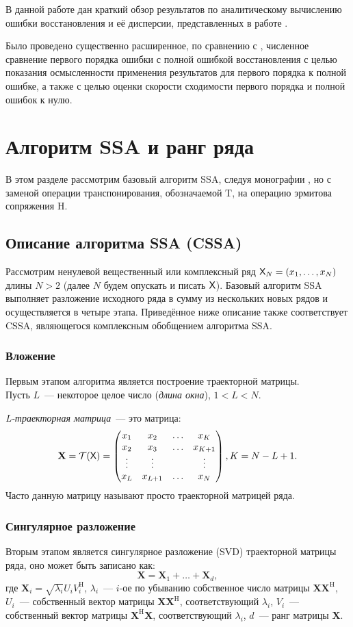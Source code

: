 \documentclass[specialist,
               substylefile = spbu.rtx,
               subf,href,colorlinks=true, 12pt]{disser}
\begin{document}
В данной работе дан краткий обзор результатов по аналитическому вычислению ошибки восстановления и её дисперсии, представленных в работе \cite{SenBach}.

Было проведено существенно расширенное, по сравнению с \cite{SenBach}, численное сравнение первого порядка ошибки с полной ошибкой восстановления с целью показания осмысленности применения результатов для первого порядка к полной ошибке, а также с целью оценки скорости сходимости первого порядка и полной ошибок к нулю.

\section{Алгоритм SSA и ранг ряда}
В этом разделе рассмотрим базовый алгоритм SSA, следуя монографии \cite{Golyandina.etal2001}, но с заменой операции транспонирования, обозначаемой $\mathrm{T}$, на операцию эрмитова сопряжения $\mathrm{H}$.
\subsection{Описание алгоритма SSA (CSSA)}
Рассмотрим ненулевой вещественный или комплексный ряд $\textsf{X}_N = (x_1, \ldots, x_{N})$ длины $N > 2$ (далее $N$ будем опускать и писать $\textsf{X}$). Базовый алгоритм SSA выполняет разложение исходного ряда в сумму из нескольких новых рядов и осуществляется в четыре этапа. Приведённое ниже описание также соответствует CSSA, являющегося комплексным обобщением алгоритма SSA.
\subsubsection{Вложение}
Первым этапом алгоритма является построение траекторной матрицы.\\
Пусть $L$~--- некоторое целое число (\textit{длина окна}), $1 < L < N$.

\textit{L-траекторная матрица}~--- это матрица:
$$\mathbf{X} = \mathcal{T}(\textsf{X}) = \begin{pmatrix}
           x_1 & x_2 & \ldots & x_{K}\\
           x_2 & x_3 & \ldots & x_{K+1}\\
           \vdots & \vdots & & \vdots\\
           x_{L} & x_{L+1} & \ldots & x_{N}
         \end{pmatrix}, K = N - L + 1.$$
Часто данную матрицу называют просто траекторной матрицей ряда.
\subsubsection{Сингулярное разложение}
Вторым этапом является сингулярное разложение (SVD) траекторной матрицы ряда, оно может быть записано как:
$$\mathbf{X} = \mathbf{X}_1 + \ldots + \mathbf{X}_d,$$
где $\mathbf{X}_i = \sqrt{\lambda_i}U_i V_i^\mathrm{H}$, $\lambda_i$~--- $i$-ое по убыванию собственное число матрицы $\mathbf{X} \mathbf{X}^{\mathrm{H}}$, $U_i$~--- собственный вектор матрицы $\mathbf{X} \mathbf{X}^{\mathrm{H}}$, соответствующий $\lambda_i$, $V_i$~--- собственный вектор матрицы $\mathbf{X}^{\mathrm{H}} \mathbf{X}$, соответствующий $\lambda_i$, $d$~--- ранг матрицы $\mathbf{X}$.
\end{document}
